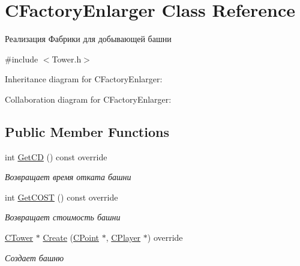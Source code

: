 \hypertarget{classCFactoryEnlarger}{}\section{C\+Factory\+Enlarger Class Reference}
\label{classCFactoryEnlarger}


Реализация Фабрики для добывающей башни  




{\ttfamily \#include $<$Tower.\+h$>$}



Inheritance diagram for C\+Factory\+Enlarger\+:


Collaboration diagram for C\+Factory\+Enlarger\+:
\subsection*{Public Member Functions}
\begin{DoxyCompactItemize}
\item 
int \hyperlink{classCFactoryEnlarger_ac27cac9cd10c75392db7f419d90e5ee8}{Get\+CD} () const override\hypertarget{classCFactoryEnlarger_ac27cac9cd10c75392db7f419d90e5ee8}{}\label{classCFactoryEnlarger_ac27cac9cd10c75392db7f419d90e5ee8}

\begin{DoxyCompactList}\small\item\em Возвращает время отката башни \end{DoxyCompactList}\item 
int \hyperlink{classCFactoryEnlarger_aba4238e18209d327012be2f2b2f33b15}{Get\+C\+O\+ST} () const override\hypertarget{classCFactoryEnlarger_aba4238e18209d327012be2f2b2f33b15}{}\label{classCFactoryEnlarger_aba4238e18209d327012be2f2b2f33b15}

\begin{DoxyCompactList}\small\item\em Возвращает стоимость башни \end{DoxyCompactList}\item 
\hyperlink{classCTower}{C\+Tower} $\ast$ \hyperlink{classCFactoryEnlarger_ac5b8ad647ba87991fb0271e2768e6d0d}{Create} (\hyperlink{classCPoint}{C\+Point} $\ast$, \hyperlink{classCPlayer}{C\+Player} $\ast$) override
\begin{DoxyCompactList}\small\item\em Создает башню \end{DoxyCompactList}\end{DoxyCompactItemize}


